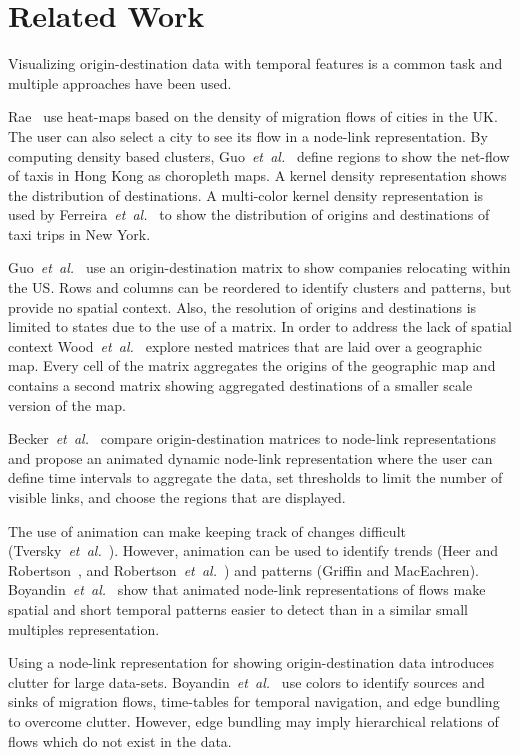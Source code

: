 \documentclass[a4paper,twocolumn]{article}
\author{Josua Krause}
\newcommand{\etal}{\emph{et~al.~}}
\begin{document}
\section*{Related Work}
Visualizing origin-destination data with temporal features
is a common task and multiple approaches have been used.

Rae~\cite{Rae2009} use heat-maps based on
the density of migration flows of cities in the UK.
The user can also select a city to see its flow
in a node-link representation.
By computing density based clusters,
Guo~\etal\cite{Guo2012} define regions
to show the net-flow of taxis in Hong Kong
as choropleth maps.
A kernel density representation shows
the distribution of destinations.
A multi-color kernel density representation is
used by Ferreira~\etal\cite{Ferreira2013}
to show the distribution of
origins and destinations of taxi trips in New York.

Guo~\etal\cite{Guo2006} use an origin-destination matrix
to show companies relocating within the US.
Rows and columns can be reordered to identify clusters
and patterns, but provide no spatial context.
Also, the resolution of origins and destinations is limited
to states due to the use of a matrix.
In order to address the lack of spatial context
Wood~\etal\cite{Wood2002} explore nested matrices
that are laid over a geographic map.
Every cell of the matrix aggregates the origins
of the geographic map and contains
a second matrix showing aggregated destinations of
a smaller scale version of the map.

Becker~\etal\cite{Becker1995} compare
origin-destination matrices to node-link representations
and propose an animated dynamic node-link representation
where the user can define time intervals to aggregate the data,
set thresholds to limit the number of visible links,
and choose the regions that are displayed.

The use of animation can make keeping track of changes
difficult (Tversky~\etal\cite{Tversky2002}).
However, animation can be used to
identify trends (Heer and Robertson~\cite{Heer2007},
and Robertson~\etal\cite{Robertson}) and
patterns (Griffin and MacEachren\cite{Griffin2006}).
Boyandin~\etal\cite{Boyandin2012} show that animated
node-link representations of flows make spatial and
short temporal patterns easier to detect than in
a similar small multiples representation.

Using a node-link representation for showing origin-destination
data introduces clutter for large data-sets.
Boyandin~\etal\cite{Boyandin2008} use colors to identify
sources and sinks of migration flows,
time-tables for temporal navigation, and
edge bundling to overcome clutter.
However, edge bundling may imply hierarchical
relations of flows which do not exist in the data.
\end{document}
